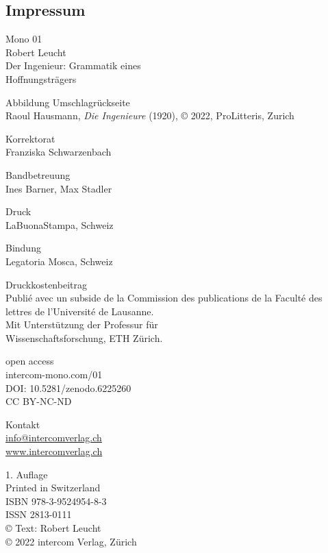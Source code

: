 \documentclass[%
	fontsize=10pt,%
	twoside,%
	headings=optiontoheadandtoc,%
	showtrims]{scrbook}
\begin{document}
\begin{multicols*}{2}
	\subsection*{Impressum}%
	\vspace{-1.25em}%
	\par Mono 01\\ Robert Leucht\\ Der Ingenieur: Grammatik eines\\ Hoffnungsträgers\par Abbildung Umschlagrückseite\\ Raoul Hausmann, \emph{Die Ingenieure} (1920), © 2022, ProLitteris, Zurich\par Korrektorat\\ Franziska Schwarzenbach\par Bandbetreuung\\ Ines Barner, Max Stadler\par Druck\\ LaBuonaStampa, Schweiz\par Bindung\\ Legatoria Mosca, Schweiz\par Druckkostenbeitrag\\ Publié avec un subside de la Commission des publications de la Faculté des lettres de l\textquoteright{}Université de Lausanne.\\ Mit Unterstützung der Professur für\\ Wissenschaftsforschung, ETH Zürich.\par open access\\ intercom-mono.com/01\\ DOI: 10.5281/zenodo.6225260\\ CC BY-NC-ND\par Kontakt\\ \href{mailto:\&\#x69;\&\#x6e;\&\#102;\&\#x6f;\&\#64;\&\#x69;\&\#x6e;\&\#x74;\&\#x65;\&\#x72;\&\#99;\&\#x6f;\&\#x6d;\&\#x76;\&\#x65;\&\#x72;\&\#x6c;\&\#x61;\&\#103;\&\#x2e;\&\#x63;\&\#x68;}{info@intercomverlag.ch}\\ \href{http://www.intercomverlag.ch}{www.intercomverlag.ch}\par ⁣1. Auflage\\ Printed in Switzerland\\ ISBN 978-3-9524954-8-3\\ ISSN 2813-0111\\ © Text: Robert Leucht\\ © 2022 intercom Verlag, Zürich%
\end{multicols*}%
\newpage%

\cleardoublepage
\end{document}
